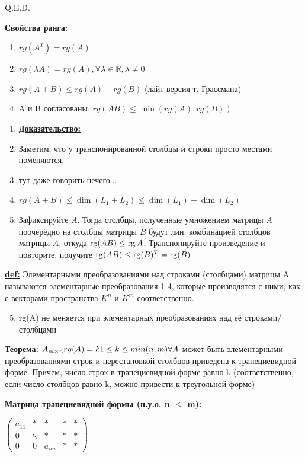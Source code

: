 \hfill Q.E.D.

\textbf{Свойства ранга:}
\begin{enumerate}
    \item $ rg(A^T) = rg(A) $
    \item $ rg(\lambda A) = rg(A), \forall \lambda \in \mathbb{R},  \lambda \ne 0 $
    \item $ rg(A+B) \leq rg(A)+rg(B) $ (лайт версия т. Грассмана)
    \item A и B согласованы, $ rg(AB) \leq \min(rg(A),rg(B)) $
\end{enumerate}
\begin{enumerate}
    \item[] \textbf{\uline{Доказательство:}}
    \item[1.] Заметим, что у транспонированной столбцы и строки просто местами поменяются.
    \item[2.] тут даже говорить нечего...
    \item[3.] $rg(A+B) \leq \dim(L_1 + L_2) \leq \dim(L_1) +\dim(L_2)$
    \item[4.] Зафиксируйте $A$. Тогда столбцы, полученные умножением матрицы $A$ поочерёдно на столбцы матрицы $B$ будут лин. комбинацией столбцов матрицы $A$, откуда $\operatorname{rg} (AB)\leq\operatorname{rg} A$. Транспонируйте произведение и повторите, получите $\operatorname{rg} (AB)\leq\operatorname{rg} (B)^T = \operatorname{rg}(B)$
\end{enumerate}

\textbf{\underline{def:}} Элементарными преобразованиями над строками (столбцами) матрицы A называются элементарные преобразования 1-4, которые производятся с ними, как с векторами пространства $K^n$ и $K^m$ соответственно.

\begin{enumerate}
    \setcounter{enumi}{4}
    \item rg(A) не меняется при элементарных преобразованиях над её строками/столбцами
\end{enumerate}

\textbf{\underline{Теорема:}}
\( A_{m \times n} \newline
rg(A) = k \newline
1 \leq k \leq min(n, m) \newline
\forall A\) может быть элементарными преобразованиями строк и перестановкой столбцов приведена к трапециевидной форме. Причем, число строк в трапециевидной форме равно k (соответственно, если число столбцов равно k, можно привести к треугольной форме)

\textbf{Матрица трапециевидной формы (н.у.о. n $\leq$ m):}

\(
\begin{pmatrix}
    a_{11} & *      & *      & * & * \\
    0      & \ddots & *      & * & * \\
    0      & 0      & a_{nn} & * & *
\end{pmatrix}
\) %


